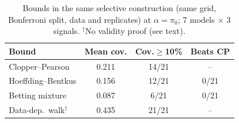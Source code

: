 \begin{table}[t]
\centering\small
\caption{Bounds in the same selective construction (same grid, Bonferroni split, data and replicates) at $\alpha=\pi_0$; 7 models $\times$ 3 signals. $^\dagger$No validity proof (see text).}
\label{tab:bounds}
\setlength{\tabcolsep}{4pt}
\begin{tabular}{lccc}
\toprule
Bound & Mean cov. & Cov.$\ge$10\% & Beats CP \\
\midrule
Clopper--Pearson & 0.211 & 14/21 & -- \\
Hoeffding--Bentkus & 0.156 & 12/21 & 0/21 \\
Betting mixture & 0.087 & 6/21 & 0/21 \\
\midrule
Data-dep.\ walk$^\dagger$ & 0.435 & 21/21 & -- \\
\bottomrule
\end{tabular}
\end{table}
